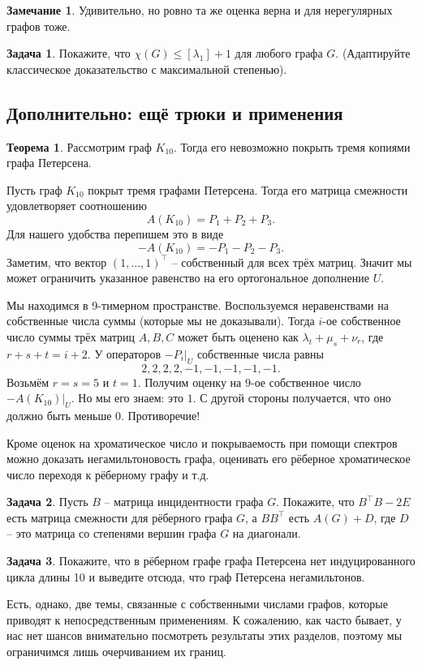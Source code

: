 \documentclass[12pt,a4paper,oneside]{book}
\theoremstyle{definition}
\newtheorem*{rem}{\color{green!50!blue}Замечание}
\newtheorem{zad}{\color{violet!100!black}Задача}
\newtheorem{thm}{\color{red!40!black}Теорема}
\renewcommand{\leq}{\leqslant}
\def\thrm{\begin{thm}}
\def\ethrm{\end{thm}}
\def\zd{\begin{zad}}
\def\ezd{\end{zad}}
\def\rm{\begin{rem}}
\def\erm{\end{rem}}
\begin{document}
\rm Удивительно, но ровно та же оценка верна и для нерегулярных графов тоже.
\erm

\zd Покажите, что $\chi(G) \leq [\lambda_1]+1$ для любого графа $G$. (Адаптируйте классическое доказательство с максимальной степенью).
\ezd


\subsection{Дополнительно: ещё трюки и применения}

\thrm Рассмотрим граф $K_{10}$. Тогда его невозможно покрыть тремя копиями графа Петерсена.
\ethrm
\proof Пусть граф $K_{10}$ покрыт тремя графами Петерсена. Тогда его матрица смежности удовлетворяет соотношению 
$$A(K_{10})=P_1+P_2+P_3.$$
Для нашего удобства перепишем это в виде 
$$-A(K_{10})=-P_1-P_2-P_3.$$
Заметим, что вектор $(1,\dots,1)^\top$ -- собственный для всех трёх матриц. Значит мы может ограничить указанное равенство на его ортогональное дополнение $U$.

Мы находимся в 9-тимерном пространстве. Воспользуемся неравенствами на собственные числа суммы (которые мы не доказывали). Тогда $i$-ое собственное число  суммы трёх матриц $A,B,C$ может быть оценено как $\lambda_t +\mu_s+ \nu_r$, где $r+s+t=i+2$. У операторов $-P_i|_U$ собственные числа равны $$2,2,2,2,-1,-1,-1,-1,-1.$$
Возьмём  $r=s=5$ и $t=1$. Получим оценку на $9$-ое собственное число $-A(K_{10})|_U$. Но мы его знаем: это $1$. С другой стороны получается, что оно должно быть меньше $0$. Противоречие! 
\endproof

Кроме оценок на хроматическое число и покрываемость при помощи спектров можно доказать негамильтоновость графа, оценивать его рёберное хроматическое число переходя к рёберному графу и т.д.

\zd Пусть $B$ -- матрица инцидентности графа $G$. Покажите, что $B^\top B - 2 E$ есть матрица смежности для рёберного графа $G$, а $B B^\top$ есть $A(G)+D$, где $D$ -- это матрица со степенями вершин графа $G$ на диагонали. 
\ezd

\zd Покажите, что в рёберном графе графа Петерсена нет индуцированного цикла длины 10 и выведите отсюда, что граф Петерсена негамильтонов.
\ezd

Есть, однако, две темы, связанные с собственными числами графов, которые приводят к непосредственным применениям. К сожалению, как часто бывает, у нас нет шансов внимательно посмотреть результаты этих разделов, поэтому мы ограничимся лишь очерчиванием их границ.
\end{document}
